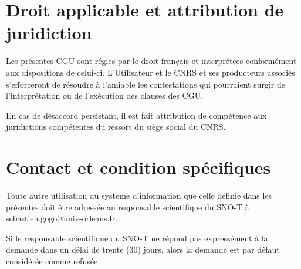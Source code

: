 \documentclass[]{article}
\begin{document}
\section{Droit applicable et attribution de juridiction}

Les présentes CGU sont régies par le droit français et interprétées conformément aux dispositions de celui-ci. L’Utilisateur et le CNRS et ses producteurs associés s’efforceront de résoudre à l’amiable les contestations qui pourraient surgir de l’interprétation ou de l’exécution des clauses des CGU.

En cas de désaccord persistant, il est fait attribution de compétence aux juridictions compétentes du ressort du siège social du CNRS.

\section{Contact et condition spécifiques}

Toute autre utilisation du système d’information que celle définie dans les présentes doit être adressée au responsable scientifique du SNO-T à sebastien.gogo@univ-orleans.fr.

Si le responsable scientifique du SNO-T ne répond pas expressément à la demande dans un délai de trente (30) jours, alors la demande est par défaut considérée comme refusée.
\end{document}
